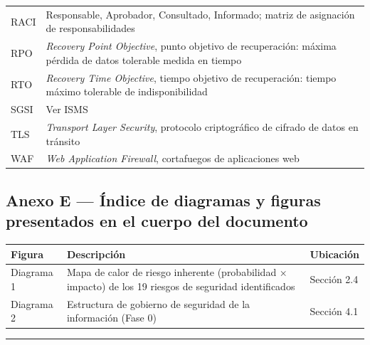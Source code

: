 \documentclass[11pt,a4paper]{article}
\begin{document}
{\begin{longtable}[]{@{}
  >{\raggedright\arraybackslash}p{}
  >{\raggedright\arraybackslash}p{}@{}}
RACI & Responsable, Aprobador, Consultado, Informado; matriz de asignación de responsabilidades \\
RPO & \emph{Recovery Point Objective}, punto objetivo de recuperación: máxima pérdida de datos tolerable medida en tiempo \\
RTO & \emph{Recovery Time Objective}, tiempo objetivo de recuperación: tiempo máximo tolerable de indisponibilidad \\
SGSI & Ver ISMS \\
TLS & \emph{Transport Layer Security}, protocolo criptográfico de cifrado de datos en tránsito \\
WAF & \emph{Web Application Firewall}, cortafuegos de aplicaciones web \\
\end{longtable}
}

\subsection{Anexo E --- Índice de diagramas y figuras presentados en el cuerpo del documento}\label{anexo-e-uxedndice-de-diagramas-y-figuras-presentados-en-el-cuerpo-del-documento}

{\small
\begin{longtable}[]{@{}
  >{\raggedright\arraybackslash}p{}
  >{\raggedright\arraybackslash}p{}
  >{\raggedright\arraybackslash}p{}@{}}
\toprule\noalign{}
\begin{minipage}[b]{\linewidth}\raggedright
Figura
\end{minipage} & \begin{minipage}[b]{\linewidth}\raggedright
Descripción
\end{minipage} & \begin{minipage}[b]{\linewidth}\raggedright
Ubicación
\end{minipage} \\
\midrule\noalign{}
\endhead
\bottomrule\noalign{}
\endlastfoot
Diagrama 1 & Mapa de calor de riesgo inherente (probabilidad × impacto) de los 19 riesgos de seguridad identificados & Sección 2.4 \\
Diagrama 2 & Estructura de gobierno de seguridad de la información (Fase 0) & Sección 4.1 \\
\end{longtable}
}

\begin{center}\rule{0.5\linewidth}{0.5pt}\end{center}
\end{document}
